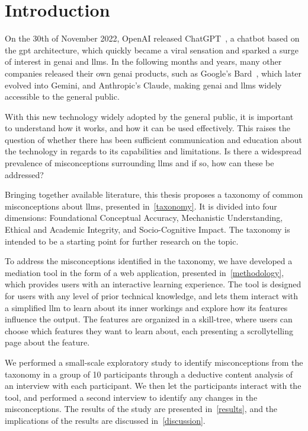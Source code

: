 \chapter{Introduction}

On the 30th of November 2022, OpenAI released ChatGPT~\cite{chatgpt}, a chatbot based on the \gls{gpt} architecture, which quickly became a viral sensation and sparked a surge of interest in \acrfull{genai} and \gls{llms}. In the following months and years, many other companies released their own \gls{genai} products, such as Google's Bard~\cite{google_bard}, which later evolved into Gemini, and Anthropic's Claude, making \gls{genai} and \gls{llms} widely accessible to the general public.

With this new technology widely adopted by the general public, it is important to understand how it works, and how it can be used effectively. This raises the question of whether there has been sufficient communication and education about the technology in regards to its capabilities and limitations. Is there a widespread prevalence of misconceptions surrounding \gls{llms} and if so, how can these be addressed? 

Bringing together available literature, this thesis proposes a taxonomy of common misconceptions about \gls{llms}, presented in\ \autoref{taxonomy}. It is divided into four dimensions: Foundational Conceptual Accuracy, Mechanistic Understanding, Ethical and Academic Integrity, and Socio-Cognitive Impact. The taxonomy is intended to be a starting point for further research on the topic. 

To address the misconceptions identified in the taxonomy, we have developed a mediation tool in the form of a web application, presented in\ \autoref{methodology}, which provides users with an interactive learning experience. The tool is designed for users with any level of prior technical knowledge, and lets them interact with a simplified \gls{llm} to learn about its inner workings and explore how its features influence the output. The features are organized in a skill-tree, where users can choose which features they want to learn about, each presenting a scrollytelling page about the feature.

We performed a small-scale exploratory study to identify misconceptions from the taxonomy in a group of 10 participants through a deductive content analysis of an interview with each participant. We then let the participants interact with the tool, and performed a second interview to identify any changes in the misconceptions. The results of the study are presented in\ \autoref{results}, and the implications of the results are discussed in\ \autoref{discussion}.
